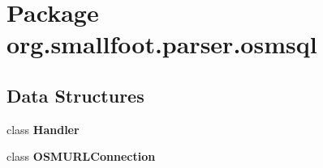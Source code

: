 \section{Package org.\+smallfoot.\+parser.\+osmsql}
\label{namespaceorg_1_1smallfoot_1_1parser_1_1osmsql}
\subsection*{Data Structures}
\begin{DoxyCompactItemize}
\item 
class {\bf Handler}
\item 
class {\bf O\+S\+M\+U\+R\+L\+Connection}
\end{DoxyCompactItemize}
